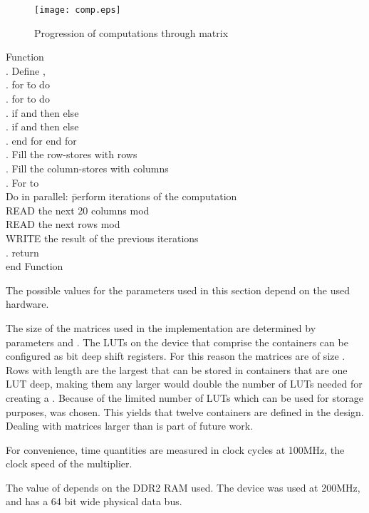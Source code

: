 \documentclass[11pt,twoside]{article}
\begin{document}
\begin{figure}[h!]
\centering
\texttt{[image: comp.eps]}
\caption{Progression of computations through matrix }
\end{figure}


\begin{tabbing}
Function \=  \\
. Define ,  \\
. for \=  to  do \\
. for  to  do \\
\> . if  and  then  else  \\
\> . if  and  then  else  \\
. end for end for \\
. Fill the row-stores with rows  \\
. Fill the column-stores with columns  \\
. For  to  \\
\>Do in parallel:  \=perform  iterations of the computation\\
\> \> READ the next 20 columns mod \\
\> \> READ the next  rows mod \\
\> \> WRITE the result of the previous  iterations\\
. return  \\
end Function \\
\end{tabbing}

The possible values for the parameters used in this section depend on the used hardware.

The size of the matrices used in the implementation are determined by parameters  and . The LUTs on the device that comprise the  containers can be configured as  bit deep shift registers. For this reason the matrices are of size . Rows with length  are the largest that can be stored in containers that are one LUT deep, making them any larger would double the number of LUTs needed for creating a . Because of the limited number of LUTs which can be used for storage purposes,  was chosen. This yields that twelve  containers are defined in the design. Dealing with matrices larger than  is part of future work.

For convenience, time quantities are measured in clock cycles at 100MHz, the clock speed of the  multiplier.

The value of  depends on the DDR2 RAM used. The device was used at 200MHz, and has a 64 bit wide physical data bus.
\end{document}
